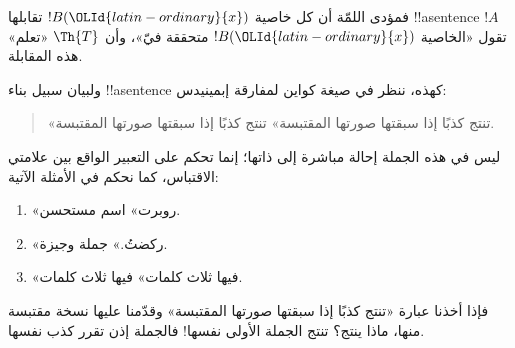 \documentclass[../../../include/open-logic-section]{subfiles}
\begin{document}
فمؤدى اللمّة أن كل خاصية $!B(\OLId{latin-ordinary}{x})$ تقابلها !!a{sentence} $!A$
تقول «الخاصية $!B(\OLId{latin-ordinary}{x})$ متحققة فيّ»، وأن $\Th{T}$ «تعلم» هذه
المقابلة.

ولبيان سبيل بناء !!a{sentence} كهذه، ننظر في صيغة كواين
لمفارقة إبمينيدس:
\begin{quote}
«تنتج كذبًا إذا سبقتها صورتها المقتبسة» تنتج كذبًا إذا سبقتها صورتها
المقتبسة.
\end{quote}
ليس في هذه الجملة إحالة مباشرة إلى ذاتها؛ إنما تحكم على التعبير
الواقع بين علامتي الاقتباس، كما نحكم في الأمثلة الآتية:
\begin{enumerate}
\item «روبرت» اسم مستحسن.
\item «ركضتُ.» جملة وجيزة.
\item «فيها ثلاث كلمات» فيها ثلاث كلمات.
\end{enumerate}
فإذا أخذنا عبارة «تنتج كذبًا إذا سبقتها صورتها المقتبسة» وقدّمنا
عليها نسخة مقتبسة منها، ماذا ينتج؟ تنتج الجملة الأولى نفسها!{}
فالجملة إذن تقرر كذب نفسها.
\end{document}
